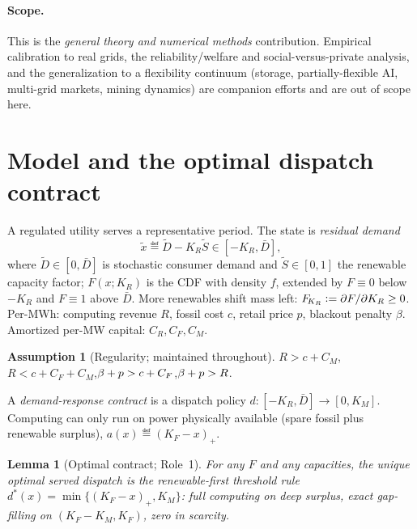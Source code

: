\documentclass[11pt,reqno]{amsart}
\theoremstyle{plain}
\newtheorem{lemma}{Lemma}\newtheorem{corollary}{Corollary}
\theoremstyle{definition}\newtheorem{condition}{Condition}\newtheorem{assumption}{Assumption}
\theoremstyle{remark}\newtheorem{remark}{Remark}
\newcommand{\KR}{K_R}\newcommand{\KF}{K_F}\newcommand{\KM}{K_M}
\newcommand{\Dbar}{\bar D}\newcommand{\CM}{C_M}\newcommand{\CF}{C_F}\newcommand{\CR}{C_R}
\begin{document}
\paragraph{Scope.} This is the \emph{general theory and numerical methods}
contribution. Empirical calibration to real grids, the reliability/welfare and
social-versus-private analysis, and the generalization to a flexibility continuum
(storage, partially-flexible AI, multi-grid markets, mining dynamics) are
companion efforts and are out of scope here.

\section{Model and the optimal dispatch contract}\label{sec:model}

A regulated utility serves a representative period. The state is \emph{residual
demand}
\begin{equation}\label{eq:resdem}
  \tilde x \eqdef \tilde D - \KR\tilde S \in[-\KR,\Dbar],
\end{equation}
where $\tilde D\in[0,\Dbar]$ is stochastic consumer demand and $\tilde S\in[0,1]$
the renewable capacity factor; $F(x;\KR)$ is the CDF with density $f$, extended by
$F\equiv0$ below $-\KR$ and $F\equiv1$ above $\Dbar$. More renewables shift mass
left: $\FKR\eqdef\partial F/\partial\KR\ge0$. Per-MWh: computing revenue $R$,
fossil cost $c$, retail price $p$, blackout penalty $\beta$. Amortized per-MW
capital: $\CR,\CF,\CM$.

\begin{assumption}[Regularity; maintained throughout]\label{ass:reg}
$R>c+\CM$,\quad $R<c+\CF+\CM$,\quad $\bp>c+\CF$,\quad $\beta+p>R$.
\end{assumption}

\noindent A \emph{demand-response contract} is a dispatch policy
$d:[-\KR,\Dbar]\to[0,\KM]$. Computing can only run on power physically available
(spare fossil plus renewable surplus), $a(x)\eqdef(\KF-x)_+$.

\begin{lemma}[Optimal contract; Role~1]\label{lem:dispatch}
For any $F$ and any capacities, the unique optimal served dispatch is the
renewable-first threshold rule
$d^{*}(x)=\min\{(\KF-x)_+,\KM\}$: full computing on deep surplus, exact
gap-filling on $(\KF-\KM,\KF)$, zero in scarcity.
\end{lemma}
\end{document}
